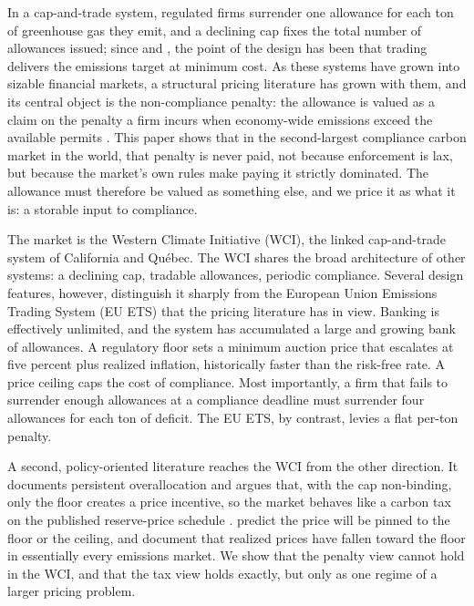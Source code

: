 \documentclass[11pt,letterpaper]{article}
\theoremstyle{plain}
\theoremstyle{definition}
\numberwithin{equation}{section}
\begin{document}
In a cap-and-trade system, regulated firms surrender one allowance for each ton of greenhouse gas they emit, and a declining cap fixes the total number of allowances issued; since \citet{dales1968} and \citet{montgomery1972}, the point of the design has been that trading delivers the emissions target at minimum cost. As these systems have grown into sizable financial markets, a structural pricing literature has grown with them, and its central object is the non-compliance penalty: the allowance is valued as a claim on the penalty a firm incurs when economy-wide emissions exceed the available permits \citep{carmona2011, howison2012, hitzemann2018}. This paper shows that in the second-largest compliance carbon market in the world, that penalty is never paid, not because enforcement is lax, but because the market's own rules make paying it strictly dominated. The allowance must therefore be valued as something else, and we price it as what it is: a storable input to compliance.

The market is the Western Climate Initiative (WCI), the linked cap-and-trade system of California and Québec. The WCI shares the broad architecture of other systems: a declining cap, tradable allowances, periodic compliance. Several design features, however, distinguish it sharply from the European Union Emissions Trading System (EU ETS) that the pricing literature has in view. Banking is effectively unlimited, and the system has accumulated a large and growing bank of allowances. A regulatory floor sets a minimum auction price that escalates at five percent plus realized inflation, historically faster than the risk-free rate. A price ceiling caps the cost of compliance. Most importantly, a firm that fails to surrender enough allowances at a compliance deadline must surrender four allowances for each ton of deficit. The EU ETS, by contrast, levies a flat per-ton penalty.

A second, policy-oriented literature reaches the WCI from the other direction. It documents persistent overallocation and argues that, with the cap non-binding, only the floor creates a price incentive, so the market behaves like a carbon tax on the published reserve-price schedule \citep{cullenward2019, inman2020, vertmartin2024}. \citet{borenstein2019} predict the price will be pinned to the floor or the ceiling, and \citet{burtrawkeyes2018} document that realized prices have fallen toward the floor in essentially every emissions market. We show that the penalty view cannot hold in the WCI, and that the tax view holds exactly, but only as one regime of a larger pricing problem.
\end{document}
